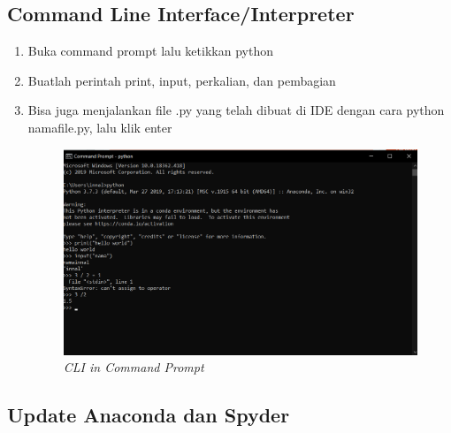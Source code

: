 \subsection{Command Line Interface/Interpreter}
\begin{enumerate}
\item Buka command prompt lalu ketikkan python
\item Buatlah perintah print, input, perkalian, dan pembagian
\item Bisa juga menjalankan file .py yang telah dibuat di IDE dengan cara python namafile.py, lalu klik enter
\begin{figure}[H]
    \centering
    \includegraphics[scale=0.5]{figures/cli}
    \caption{\textit{CLI in Command Prompt}}
    \label{CLI}
\end{figure}
\end{enumerate}

\subsection{Update Anaconda dan Spyder}
